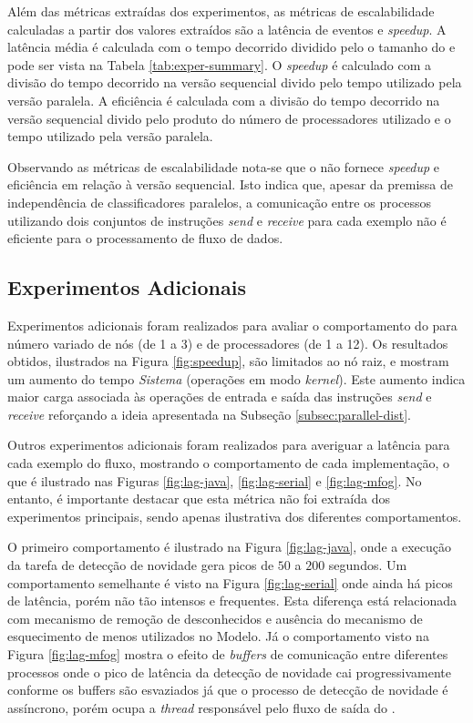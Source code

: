 Além das métricas extraídas dos experimentos, as métricas de escalabilidade
calculadas a partir dos valores extraídos são a latência de eventos e
\emph{speedup}. %
A latência média é calculada com o tempo decorrido dividido pelo o tamanho do
\dataset e pode ser vista na Tabela \ref{tab:exper-summary}.
O \emph{speedup} é calculado com a divisão do tempo decorrido na versão
sequencial divido pelo tempo utilizado pela versão paralela.
A eficiência é calculada com a divisão do tempo decorrido na versão sequencial
divido pelo produto do número de processadores utilizado e o tempo utilizado
pela versão paralela.

Observando as métricas de escalabilidade nota-se que o \mfog não fornece
\emph{speedup} e eficiência em relação à versão sequencial.
Isto indica que, apesar da premissa de independência de classificadores
paralelos, a comunicação entre os processos utilizando dois conjuntos de
instruções \mpi \emph{send} e \emph{receive} para cada exemplo não é eficiente
para o processamento de fluxo de dados.

\subsection{Experimentos Adicionais}

Experimentos adicionais foram realizados para avaliar o comportamento do \mfog
para número variado de nós (de 1 a 3) e de processadores (de 1 a 12).
Os resultados obtidos, ilustrados na Figura \ref{fig:speedup}, são limitados ao
nó raiz, e mostram um aumento do tempo \emph{Sistema} (operações em modo
\emph{kernel}).
Este aumento indica maior carga associada às operações de entrada e saída das
instruções \emph{send} e \emph{receive} reforçando a ideia apresentada na
Subseção \ref{subsec:parallel-dist}.

Outros experimentos adicionais foram realizados para averiguar a latência para
cada exemplo do fluxo, mostrando o comportamento de cada implementação, o que é
ilustrado nas Figuras \ref{fig:lag-java}, \ref{fig:lag-serial} e
\ref{fig:lag-mfog}.
No entanto, é importante destacar que esta métrica não foi extraída dos
experimentos principais, sendo apenas ilustrativa dos diferentes comportamentos.


O primeiro comportamento é ilustrado na Figura \ref{fig:lag-java}, onde a execução
da tarefa de detecção de novidade gera picos de $50$ a $200$ segundos.
Um comportamento semelhante é visto na Figura \ref{fig:lag-serial} onde ainda há
picos de latência, porém não tão intensos e frequentes.
Esta diferença está relacionada com mecanismo de remoção de desconhecidos e
ausência do mecanismo de esquecimento de \mclusters menos utilizados no Modelo.
Já o comportamento visto na Figura \ref{fig:lag-mfog} mostra o efeito de
\emph{buffers} de comunicação entre diferentes processos onde o pico de latência
da detecção de novidade cai progressivamente conforme os buffers são esvaziados
já que o processo de detecção de novidade é assíncrono, porém ocupa a \emph{thread}
responsável pelo fluxo de saída do \mfog.

